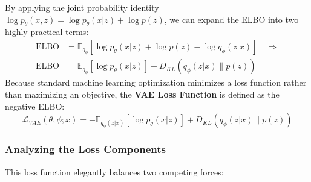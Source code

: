 By applying the joint probability identity $\log p_\theta(x,z) = \log p_\theta(x|z) + \log p(z)$, we can expand the ELBO into two highly practical terms:
\begin{equation*}
\begin{aligned}
    \text{ELBO} &= \mathbb{E}_{q_\phi} [\log p_\theta(x|z) + \log p(z) - \log q_\phi(z|x)] \quad \Rightarrow \\
    \text{ELBO} &= \mathbb{E}_{q_\phi} [\log p_\theta(x|z)] - D_{KL}(q_\phi(z|x) \parallel p(z))
\end{aligned}
\end{equation*}
Because standard machine learning optimization minimizes a loss function rather than maximizing an objective, the \textbf{VAE Loss Function} is defined as the negative ELBO:
\begin{equation}
    \mathcal{L}_{VAE}(\theta, \phi; x) = - \mathbb{E}_{q_\phi(z|x)}[\log p_\theta(x|z)] + D_{KL}(q_\phi(z|x) \parallel p(z))
\end{equation}

\subsubsection*{Analyzing the Loss Components}
This loss function elegantly balances two competing forces:

